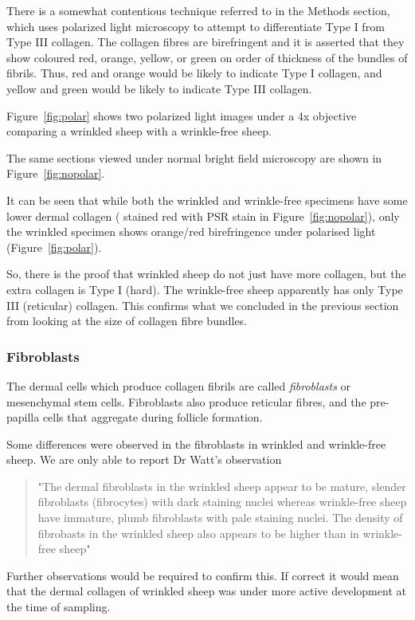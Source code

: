 \documentclass[titlepage]{article}  %
\begin{document}
There is a somewhat contentious technique referred to in the Methods section, which uses polarized light microscopy to attempt to differentiate Type I from Type III collagen.  The collagen fibres are birefringent and it is asserted that they show coloured red, orange, yellow, or green on order of thickness of the bundles of fibrils. Thus, red and orange would be likely to indicate Type I collagen, and yellow and green would be likely to indicate Type III collagen.

Figure~\ref{fig:polar} shows two polarized light images under a 4x objective comparing a wrinkled sheep with a wrinkle-free sheep.

The same sections viewed under normal bright field microscopy are shown in Figure~\ref{fig:nopolar}. 

It can be seen that while both the wrinkled and wrinkle-free specimens have some lower dermal collagen ( stained red with PSR stain in Figure~\ref{fig:nopolar}), only the wrinkled specimen shows orange/red birefringence under polarised light (Figure~\ref{fig:polar}). 

So, there is the proof that wrinkled sheep do not just have more collagen, but the extra collagen is Type I (hard). The wrinkle-free sheep apparently has only Type III (reticular) collagen. This confirms what we concluded in the previous section from looking at the size of collagen fibre bundles.

\subsubsection{Fibroblasts}
The dermal cells which produce collagen fibrils are called {\em fibroblasts} or mesenchymal stem cells.  Fibroblasts also produce reticular fibres, and the pre-papilla cells that aggregate during follicle formation.

Some differences were observed in the fibroblasts in wrinkled and wrinkle-free sheep. We are only able to report Dr Watt's observation
\begin{quote}
"The dermal fibroblasts in the wrinkled sheep appear to be mature, slender fibroblasts (fibrocytes) with dark staining nuclei whereas wrinkle-free sheep have immature, plumb fibroblasts with pale staining nuclei. The density of fibrobasts in the wrinkled sheep also appears to be higher than in wrinkle-free sheep"
\end{quote}

Further observations would be required to confirm this. If correct it would mean that the dermal collagen of wrinkled sheep was under more active development at the time of sampling.
\end{document}
